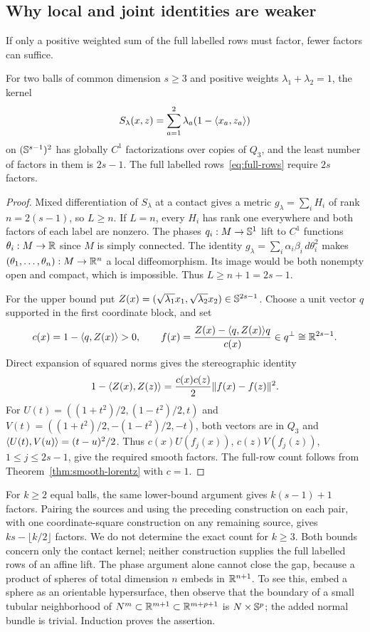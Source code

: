 \subsection{Why local and joint identities are weaker}
If only a positive weighted sum of the full labelled rows must factor,
fewer factors can suffice.
\begin{proposition}\label{prop:joint}
For two balls of common dimension $s\geq3$ and positive weights
$\lambda_1+\lambda_2=1$, the kernel
\[
 S_\lambda(x,z)=\sum_{a=1}^2\lambda_a(1-\langle x_a,z_a\rangle)
\]
on $(\mathbb S^{s-1})^2$ has globally $C^1$ factorizations over copies of
$Q_3$, and the least number of factors in them is $2s-1$. The full
labelled rows~\eqref{eq:full-rows} require $2s$ factors.
\end{proposition}
\begin{proof}
Mixed differentiation of $S_\lambda$ at a contact gives a metric
$g_\lambda=\sum_iH_i$ of rank $n=2(s-1)$, so $L\geq n$.
If $L=n$, every $H_i$ has rank one everywhere and both factors of each
label are nonzero. The phases $q_i:M\to\mathbb S^1$ lift to $C^1$
functions $\theta_i:M\to\mathbb R$ since $M$ is simply connected. The identity
$g_\lambda=\sum_i\alpha_i\beta_i\,d\theta_i^2$ makes
$(\theta_1,\ldots,\theta_n):M\to\mathbb R^n$ a local diffeomorphism.
Its image would be both nonempty open and compact, which is impossible.
Thus $L\geq n+1=2s-1$.

For the upper bound put
$Z(x)=(\sqrt{\lambda_1}x_1,\sqrt{\lambda_2}x_2)\in\mathbb S^{2s-1}$.
Choose a unit vector $q$ supported in the first coordinate block, and set
\[
 c(x)=1-\langle q,Z(x)\rangle>0,\qquad
 f(x)=\frac{Z(x)-\langle q,Z(x)\rangle q}{c(x)}\in q^\perp\cong\mathbb R^{2s-1}.
\]
Direct expansion of squared norms gives the stereographic identity
\[
 1-\langle Z(x),Z(z)\rangle=\frac{c(x)c(z)}2\lVert f(x)-f(z)\rVert^2.
\]
For $U(t)=((1+t^2)/2,(1-t^2)/2,t)$ and
$V(t)=((1+t^2)/2,-(1-t^2)/2,-t)$, both vectors are in $Q_3$ and
$\langle U(t),V(u)\rangle=(t-u)^2/2$. Thus
$c(x)U(f_j(x))$, $c(z)V(f_j(z))$, $1\leq j\leq2s-1$, give the
required smooth factors. The full-row count follows from
Theorem~\ref{thm:smooth-lorentz} with $c=1$.
\end{proof}

For $k\geq2$ equal balls, the same lower-bound argument gives
$k(s-1)+1$ factors. Pairing the sources and using the preceding
construction on each pair, with one coordinate-square construction on
any remaining source, gives $ks-\lfloor k/2\rfloor$ factors. We do not
determine the exact count for $k\geq3$. Both bounds concern only the
contact kernel; neither construction supplies the full labelled rows of
an affine lift. The phase argument alone cannot close the gap, because a
product of spheres of total dimension $n$ embeds in $\mathbb R^{n+1}$. To see
this, embed a sphere as an orientable hypersurface,
then observe that the boundary of a small tubular neighborhood of
$N^m\subset\mathbb R^{m+1}\subset\mathbb R^{m+p+1}$ is $N\times\mathbb S^p$;
the added normal bundle is trivial. Induction proves the assertion.

